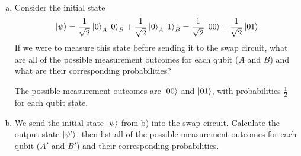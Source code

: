 \documentclass[10pt,letterpaper]{article}
\begin{document}
\begin{enumerate}
\begin{enumerate}[a)]
\color{violet}
Given the input state $\ket{\psi}$, the swap gate operation would look like
\begin{gather*}
CNOT\left( CNOT' \left( CNOT\left( \begin{bmatrix}
\alpha_{00} \\
\alpha_{01} \\
\alpha_{10} \\
\alpha_{11} 
\end{bmatrix} \right) \right) \right) = CNOT\left( CNOT'\left( \begin{bmatrix}
\alpha_{00} \\
\alpha_{01} \\
\alpha_{11} \\
\alpha_{10} 
\end{bmatrix} \right) \right) = CNOT\left( \begin{bmatrix}
\alpha_{00} \\
\alpha_{10} \\
\alpha_{11} \\
\alpha_{01} 
\end{bmatrix} \right) = \begin{bmatrix}
\alpha_{00} \\
\alpha_{10} \\
\alpha_{01} \\
\alpha_{11} 
\end{bmatrix} \\
\rightarrow \alpha_{00}\ket{00} + \alpha_{10}\ket{01} + \alpha_{01}\ket{10} + \alpha_{11}\ket{11}
\end{gather*}
\color{black}

\item Consider the initial state
$$\ket{\psi} = \frac{1}{\sqrt{2}}\ket{0}_{A}\ket{0}_{B} + \frac{1}{\sqrt{2}}\ket{0}_{A}\ket{1}_{B} = \frac{1}{\sqrt{2}}\ket{00} + \frac{1}{\sqrt{2}}\ket{01}$$
If we were to measure this state before sending it to the swap circuit, what are all of the possible measurement outcomes for each qubit ($A$ and $B$) and what are their corresponding probabilities?

\color{violet}
The possible measurement outcomes are $\ket{00}$ and $\ket{01}$, with probabilities $\frac{1}{2}$ for each qubit state. 
\color{black}

\item We send the initial state $\ket{\psi}$ from b) into the swap circuit. Calculate the output state $\ket{\psi'}$, then list all of the possible measurement outcomes for each qubit ($A'$ and $B'$) and their corresponding probabilities.


\end{enumerate}
\end{enumerate}
\end{document}
